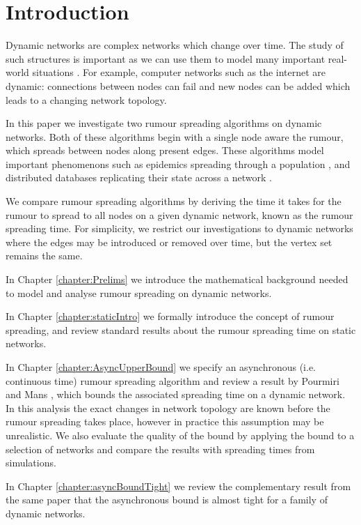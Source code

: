 \chapter{Introduction}

Dynamic networks are complex networks which change over time. The study of such structures is important as we can use them to model many important real-world situations \cite{motivation}. For example, computer networks such as the internet are dynamic: connections between nodes can fail and new nodes can be added which leads to a changing network topology. 

In this paper we investigate two rumour spreading algorithms on dynamic networks. Both of these algorithms begin with a single node aware the rumour, which spreads between nodes along present edges. These algorithms model important phenomenons such as epidemics spreading through a population \cite{staticsWellUnderstood}, and distributed databases replicating their state across a network \cite{stateReplication}. 

We compare rumour spreading algorithms by deriving the time it takes for the rumour to spread to all nodes on a given dynamic network, known as the rumour spreading time. 
For simplicity, we restrict our investigations to dynamic networks where the edges may be introduced or removed over time, but the vertex set remains the same. %

In Chapter \ref{chapter:Prelims} we introduce the mathematical background needed to model and analyse rumour spreading on dynamic networks.

In Chapter \ref{chapter:staticIntro} we formally introduce the concept of rumour spreading, and review standard results about the rumour spreading time on static networks.

In Chapter \ref{chapter:AsyncUpperBound} we specify an asynchronous (i.e. continuous time) rumour spreading algorithm and review a result by Pourmiri and Mans \cite{asyncPaper}, which bounds the associated spreading time on a dynamic network. In this analysis the exact changes in network topology are known before the rumour spreading takes place, however in practice this assumption may be unrealistic. We also evaluate the quality of the bound by applying the bound to a selection of networks and compare the results with spreading times from simulations.

In Chapter \ref{chapter:asyncBoundTight} we review the complementary result from the same paper \cite{asyncPaper} that the asynchronous bound is almost tight for a family of dynamic networks.

